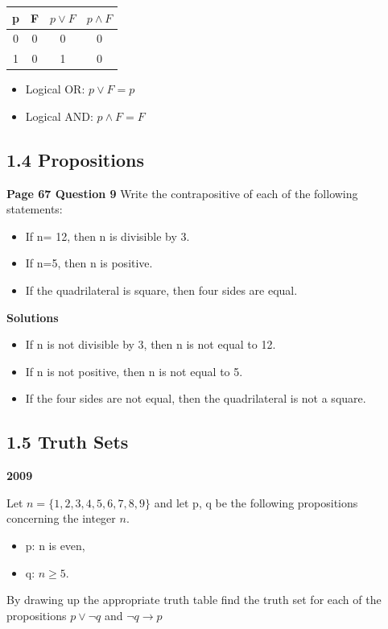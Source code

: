 \documentclass[]{report}
\begin{document}
\begin{center}
{
\begin{tabular}{|c|c||c|c|}
\hline  p & F & $p \vee F$ & $ p \wedge F$ \\ \hline
\hline  0 & 0 & 0 & 0 \\ 
\hline  1 &  0 & 1 & 0 \\ 
\hline 
\end{tabular} 
}
\end{center}
\begin{itemize}
\item Logical OR:  $p \vee F = p $
\item Logical AND: $p \wedge F = F $
\end{itemize}
\subsection*{1.4 Propositions}
\textbf{Page 67 Question 9}
Write the contrapositive of each of the following statements:

\begin{itemize}
\item If n= 12, then n is divisible by 3.
\item If n=5, then n is positive.
\item If the quadrilateral is square, then four sides are equal.
\end{itemize}

\textbf{Solutions}
\begin{itemize}
\item If n is not divisible by 3, then n is not equal to 12.
\item If n is not positive, then n is not equal to 5.
\item If the four sides are not equal, then the quadrilateral is not a square.
\end{itemize}


\subsection*{1.5 Truth Sets}
\textbf{2009} 

Let $n = \{1, 2,3,4, 5,6,7, 8, 9\}$ and let p, q be the following propositions concerning the integer $n$.
\begin{itemize}
\item p: n is even, 
\item q: $n\geq 5$.
\end{itemize}
By drawing up the appropriate truth table ﬁnd the truth set for each of the
propositions $p \vee \neg q$ and $ \neg q \rightarrow p$
\end{document}

